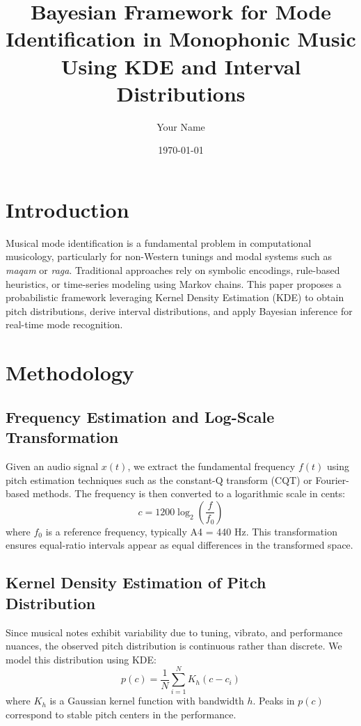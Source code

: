 \documentclass{article}
\title{Bayesian Framework for Mode Identification in Monophonic Music Using KDE and Interval Distributions}
\author{Your Name}
\date{\today}
\begin{document}
\maketitle

\section{Introduction}
Musical mode identification is a fundamental problem in computational musicology, particularly for non-Western tunings and modal systems such as \textit{maqam} or \textit{raga}. Traditional approaches rely on symbolic encodings, rule-based heuristics, or time-series modeling using Markov chains. This paper proposes a probabilistic framework leveraging Kernel Density Estimation (KDE) to obtain pitch distributions, derive interval distributions, and apply Bayesian inference for real-time mode recognition.

\section{Methodology}

\subsection{Frequency Estimation and Log-Scale Transformation}
Given an audio signal $x(t)$, we extract the fundamental frequency $f(t)$ using pitch estimation techniques such as the constant-Q transform (CQT) or Fourier-based methods. The frequency is then converted to a logarithmic scale in cents:
\begin{equation}
    c = 1200 \log_2 \left( \frac{f}{f_0} \right)
\end{equation}
where $f_0$ is a reference frequency, typically A4 = 440 Hz. This transformation ensures equal-ratio intervals appear as equal differences in the transformed space.

\subsection{Kernel Density Estimation of Pitch Distribution}
Since musical notes exhibit variability due to tuning, vibrato, and performance nuances, the observed pitch distribution is continuous rather than discrete. We model this distribution using KDE:
\begin{equation}
    p(c) = \frac{1}{N} \sum_{i=1}^{N} K_h(c - c_i)
\end{equation}
where $K_h$ is a Gaussian kernel function with bandwidth $h$. Peaks in $p(c)$ correspond to stable pitch centers in the performance.
\end{document}
